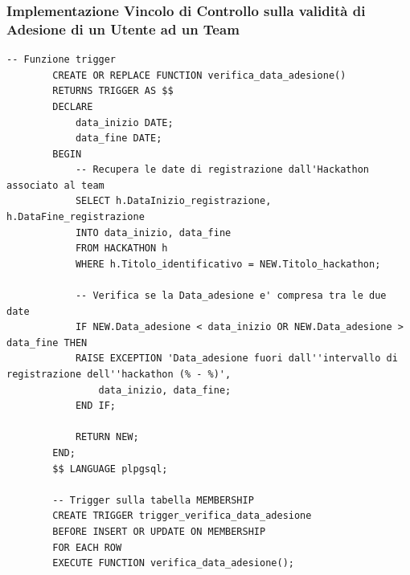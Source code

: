 \documentclass[a4paper, 10pt]{article}
\begin{document}
	\subsubsection{Implementazione Vincolo di Controllo sulla validità di Adesione di un Utente ad un Team}
	\begin{lstlisting}[style=sqlstyle]
		-- Funzione trigger
		CREATE OR REPLACE FUNCTION verifica_data_adesione()
		RETURNS TRIGGER AS $$
		DECLARE
			data_inizio DATE;
			data_fine DATE;
		BEGIN
			-- Recupera le date di registrazione dall'Hackathon associato al team
			SELECT h.DataInizio_registrazione, h.DataFine_registrazione
			INTO data_inizio, data_fine
			FROM HACKATHON h
			WHERE h.Titolo_identificativo = NEW.Titolo_hackathon;
			
			-- Verifica se la Data_adesione e' compresa tra le due date
			IF NEW.Data_adesione < data_inizio OR NEW.Data_adesione > data_fine THEN
			RAISE EXCEPTION 'Data_adesione fuori dall''intervallo di registrazione dell''hackathon (% - %)', 
				data_inizio, data_fine;
			END IF;
			
			RETURN NEW;
		END;
		$$ LANGUAGE plpgsql;
		
		-- Trigger sulla tabella MEMBERSHIP
		CREATE TRIGGER trigger_verifica_data_adesione
		BEFORE INSERT OR UPDATE ON MEMBERSHIP
		FOR EACH ROW
		EXECUTE FUNCTION verifica_data_adesione();
	\end{lstlisting}
\end{document}
